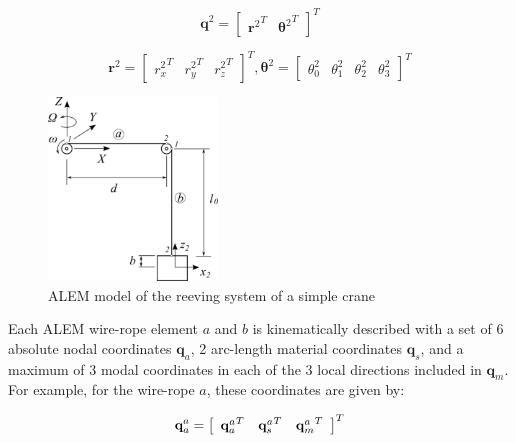 \begin{equation}
    {{\textbf{q}}}^{2} = {\left[ {\begin{array}{*{20}{c}}{\textbf{r}^{2}}^T&{\boldsymbol{\theta}^{2}}^T \end{array}} \right]^T}
\end{equation}

\begin{equation}
  {\textbf{r}}^{2} = {\left[ {\begin{array}{*{20}{c}}{{{{r}}_x^{2}}^T}&{{{{r}}_y^{2}}^T}&
  {{{{r}}_z^{2}}^T} \end{array}} \right]^T},     \boldsymbol{\theta}^{2} = {\left[ {\begin{array}{*{20}{c}}{{\theta_{0}^{2}}}&{{\theta_{1}^{2}}}&{{\theta_{2}^{2}}}&{{\theta_{3}^{2}}}\end{array}} \right]^T}  
\end{equation}

\begin{figure}
    \centering
    \includegraphics[width=0.4\textwidth]{Figures/simpleCrane.png}
    \caption{ALEM model of the reeving system of a simple crane}
    \label{fig:ex_reeving_system}
\end{figure}

Each ALEM wire-rope element $a$ and $b$ is kinematically described with a set of 6 absolute nodal coordinates $\textbf{q}_a$, 2 arc-length material coordinates $\textbf{q}_s$, and a maximum of 3 modal coordinates in each of the 3 local directions included in $\textbf{q}_m$. For example, for the wire-rope $a$, these coordinates are given by:

\begin{equation}
  {\textbf{q}}_a^{a} = {\left[ {\begin{array}{*{20}{c}}{{{\bf{q}}_a^{a}}^T}&{{{\bf{q}}_s^{a}}^T} & {{{\bf{q}}_m^{a}}^T} \end{array}} \right]^T}
\end{equation}

